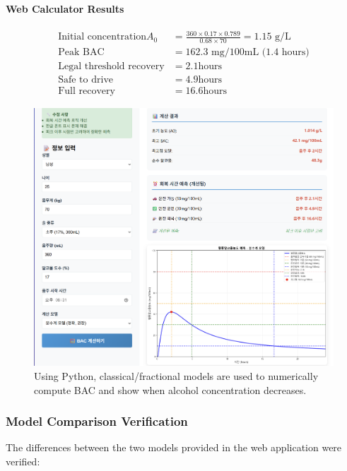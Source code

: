 \documentclass[11pt]{article}
\begin{document}
\paragraph{Web Calculator Results}
\begin{align}
\text{Initial concentration} A_0 &= \frac{360 \times 0.17 \times 0.789}{0.68 \times 70} = 1.15 \text{ g/L} \\
\text{Peak BAC} &= 162.3 \text{ mg/100mL (1.4 hours)} \\
\text{Legal threshold recovery} &= 2.1 \text{hours} \\
\text{Safe to drive} &= 4.9 \text{hours} \\
\text{Full recovery} &= 16.6 \text{hours}
\end{align}

\begin{figure}[H]
    \centering
    \includegraphics[width=\textwidth]{Web_calculator.png}
    \caption{Using Python, classical/fractional models are used to numerically compute BAC and show when alcohol concentration decreases.}
    \label{fig:web_calculator}
\end{figure}

\subsubsection{Model Comparison Verification}

The differences between the two models provided in the web application were verified:
\end{document}
